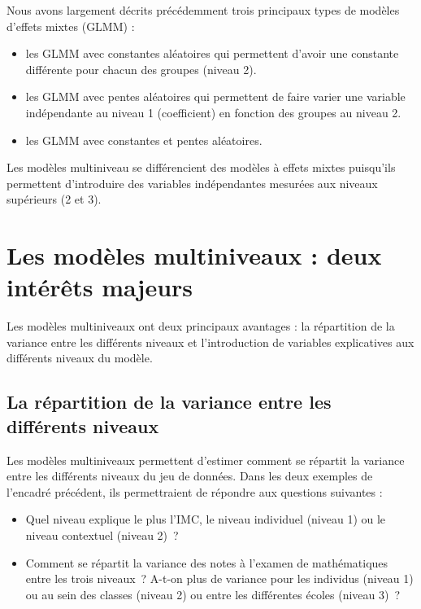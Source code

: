 \documentclass[
  11pt,
  french,
]{book}
\providecommand{\tightlist}{%
  \setlength{\itemsep}{0pt}\setlength{\parskip}{0pt}}
\begin{document}
Nous avons largement décrits précédemment trois principaux types de modèles d'effets mixtes (GLMM) :

\begin{itemize}
\tightlist
\item
  les GLMM avec constantes aléatoires qui permettent d'avoir une constante différente pour chacun des groupes (niveau 2).
\item
  les GLMM avec pentes aléatoires qui permettent de faire varier une variable indépendante au niveau 1 (coefficient) en fonction des groupes au niveau 2.
\item
  les GLMM avec constantes et pentes aléatoires.
\end{itemize}

Les modèles multiniveau se différencient des modèles à effets mixtes puisqu'ils permettent d'introduire des variables indépendantes mesurées aux niveaux supérieurs (2 et 3).

\hypertarget{sect081}{%
\section{Les modèles multiniveaux : deux intérêts majeurs}\label{sect081}}

Les modèles multiniveaux ont deux principaux avantages : la répartition de la variance entre les différents niveaux et l'introduction de variables explicatives aux différents niveaux du modèle.

\hypertarget{sect0811}{%
\subsection{La répartition de la variance entre les différents niveaux}\label{sect0811}}

Les modèles multiniveaux permettent d'estimer comment se répartit la variance entre les différents niveaux du jeu de données. Dans les deux exemples de l'encadré précédent, ils permettraient de répondre aux questions suivantes :

\begin{itemize}
\tightlist
\item
  Quel niveau explique le plus l'IMC, le niveau individuel (niveau 1) ou le niveau contextuel (niveau 2)~?
\item
  Comment se répartit la variance des notes à l'examen de mathématiques entre les trois niveaux~? A-t-on plus de variance pour les individus (niveau 1) ou au sein des classes (niveau 2) ou entre les différentes écoles (niveau 3)~?
\end{itemize}
\end{document}
